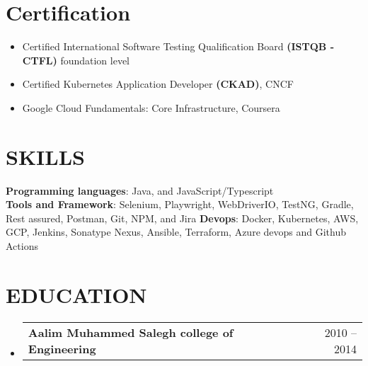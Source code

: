 \documentclass[letterpaper,11pt]{article}
\makeatletter
\newcommand{\resumeItem}[1]{
  \item\small{
    {#1 \vspace{-1pt}}
  }
}
\newcommand{\resumeSubheading}[4]{
  \vspace{-1pt}\item
    \begin{tabular*}{\textwidth}[t]{l@{\extracolsep{\fill}}r}
      \textbf{#1} & {\color{dark-grey}\small #2}\vspace{1pt}\\ %
    \end{tabular*}\vspace{-4pt}
}
\newcommand{\resumeSubHeadingListStart}{\begin{itemize}[leftmargin=0in, label={}]}
\newcommand{\resumeSubHeadingListEnd}{\end{itemize}}
\newcommand{\resumeItemListStart}{\begin{itemize}}
\newcommand{\resumeItemListEnd}{\end{itemize}\vspace{0pt}}
\makeatother
\begin{document}
%
\section{Certification}
  \small
  \resumeItemListStart
    \resumeItem{Certified International Software Testing Qualification Board \textbf{(ISTQB - CTFL)} foundation
    level}
    \resumeItem{Certified Kubernetes Application Developer \textbf{(CKAD)}, CNCF}
    \resumeItem{Google Cloud Fundamentals: Core Infrastructure, Coursera}
  \resumeItemListEnd

%
\section{SKILLS}
 \begin{itemize}[leftmargin=0in, label={}]
    \small{\item{
     \textbf{Programming languages}{: Java, and JavaScript/Typescript} \\
     \textbf{Tools and Framework}{: Selenium, Playwright, WebDriverIO, TestNG, Gradle, Rest assured, Postman, Git, NPM, and Jira}
     \textbf{Devops}{: Docker, Kubernetes, AWS, GCP, Jenkins, Sonatype Nexus, Ansible, Terraform, Azure devops and Github Actions}
    }}
 \end{itemize}

\section {EDUCATION}
\resumeSubHeadingListStart
  \resumeSubheading
    {Aalim Muhammed Salegh college of Engineering}{2010 -- 2014}
    {Bachelor of Technology in Information Technology}{}
      
\resumeSubHeadingListEnd

\end{document}
